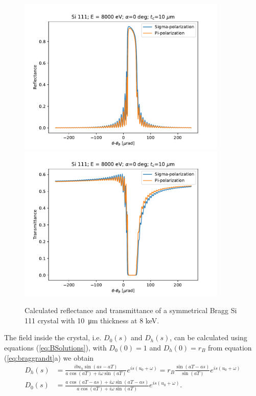 \documentclass[preprint]{iucr}              %
\begin{document}
\begin{figure}\label{fig:braggProfiles}
    \centering
    \includegraphics[width=0.89\textwidth]{figures/Bragg_1.pdf}
    \includegraphics[width=0.89\textwidth]{figures/Bragg_2.pdf}
    \caption{Calculated reflectance and transmittance of a symmetrical Bragg Si 111 crystal with \SI{10}{\micro\meter} thickness at 8 keV. }
\end{figure}

The field inside the crystal, i.e. $D_0(s)$ and $D_h(s)$, can be calculated using equations (\ref{eq:BSolutions}), with $D_0(0)=1$ and $D_h(0)=r_B$ from equation (\ref{eq:braggrandt}a) we obtain
\begin{subequations}\label{eq:bragginside}
\begin{align}
D_h(s)&=\frac{i b u_h \sin(as - aT)}{a \cos(aT) + i \omega \sin(aT)} e^{is(u_0+\omega)} 
= r_B \frac{\sin(aT - as)}{\sin(aT)} e^{is(u_0+\omega)}\\
D_0(s)&= \frac{a \cos(aT-as) + i \omega \sin(aT-as)}{a \cos(aT) + i \omega \sin(aT)} e^{is(u_0+\omega)}.
\end{align}
\end{subequations}
\end{document}

